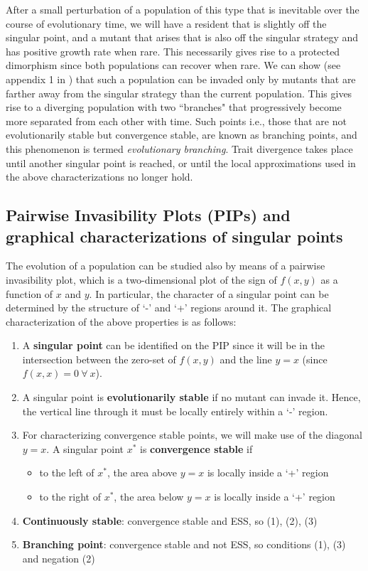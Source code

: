 After a small perturbation of a population of this type that is inevitable over the course of evolutionary time, we will have a resident that is slightly off the singular point, and a mutant that arises that is also off the singular strategy and has positive growth rate when rare. 
This necessarily gives rise to a protected dimorphism since both populations can recover when rare. 
We can show (see appendix 1 in \cite{geritz_evolutionarily_1998})  that such a population can be invaded only by mutants that are farther away from the singular strategy than the current population.
This gives rise to a diverging population with two ``branches" that progressively become more separated from each other with time. 
Such points i.e., those that are not evolutionarily stable but convergence stable, are known as branching points, and this phenomenon is termed \textit{evolutionary branching}.
Trait divergence takes place until another singular point is reached, or until the local approximations used in the above characterizations no longer hold. 

\subsection{Pairwise Invasibility Plots (PIPs) and graphical characterizations of singular points}

The evolution of a population can be studied also by means of a pairwise invasibility plot, which is a two-dimensional plot of the sign of $f(x,y)$ as a function of $x$ and $y$. 
In particular, the character of a singular point can be determined by the structure of `-' and `+' regions around it. 
The graphical characterization of the above properties is as follows:
\begin{enumerate}
	\item A \textbf{singular point} can be identified on the PIP since it will be in the intersection between the zero-set of $f(x,y)$ and the line $y=x$ (since $f(x,x)=0 \ \forall \ x$). 
	\item A singular point is \textbf{evolutionarily stable} if no mutant can invade it. Hence, the vertical line through it must be locally entirely within a `-' region. 
	\item For characterizing convergence stable points, we will make use of the diagonal $y=x$. A singular point $x^*$ is \textbf{convergence stable} if
	\begin{itemize}
		\item to the left of $x^*$, the area above $y=x$ is locally inside a `+' region
		\item to the right of $x^*$, the area below $y=x$ is locally inside a `+' region 
	\end{itemize}   
	\item \textbf{Continuously stable}: convergence stable and ESS, so (1), (2), (3)
	\item \textbf{Branching point}: convergence stable and not ESS, so conditions (1), (3) and negation (2)
\end{enumerate}

